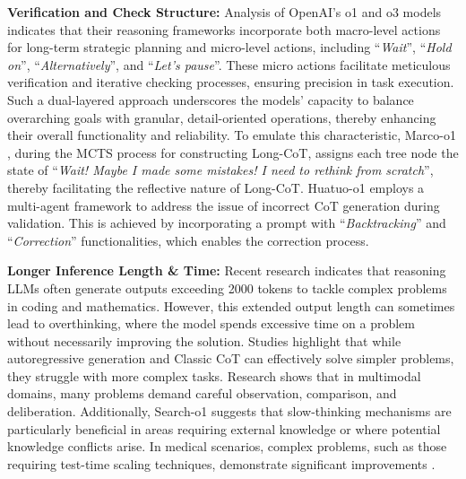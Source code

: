 \noindent\textbf{Verification and Check Structure:} Analysis of OpenAI's o1 \cite{openai_o1} and o3 \cite{o3-mini} models indicates that their reasoning frameworks incorporate both macro-level actions for long-term strategic planning and micro-level actions, including ``\textit{Wait}'', ``\textit{Hold on}'', ``\textit{Alternatively}'', and ``\textit{Let’s pause}''. 
These micro actions facilitate meticulous verification and iterative checking processes, ensuring precision in task execution. 
Such a dual-layered approach underscores the models' capacity to balance overarching goals with granular, detail-oriented operations, thereby enhancing their overall functionality and reliability. 
To emulate this characteristic, Marco-o1 \cite{Marco_o1}, during the MCTS process for constructing Long-CoT, assigns each tree node the state of ``\textit{Wait! Maybe I made some mistakes! I need to rethink from scratch}'', thereby facilitating the reflective nature of Long-CoT. 
Huatuo-o1 \cite{Huatuo-o1} employs a multi-agent framework to address the issue of incorrect CoT generation during validation. 
This is achieved by incorporating a prompt with ``\textit{Backtracking}'' and ``\textit{Correction}'' functionalities,  which enables the correction process.

\noindent\textbf{Longer Inference Length \& Time:} 
Recent research \cite{TowardsSystem2ReasoninLLM, o1_Journey_Part1, o1_Journey_Part2, huang2025o1, reflection_window} indicates that reasoning LLMs often generate outputs exceeding 2000 tokens to tackle complex problems in coding and mathematics. 
However, this extended output length can sometimes lead to overthinking, where the model spends excessive time on a problem without necessarily improving the solution. 
Studies \cite{TowardsSystem2ReasoninLLM} highlight that while autoregressive generation and Classic CoT can effectively solve simpler problems, they struggle with more complex tasks. 
Research \cite{VisualSlowAgent, SlowPerception} shows that in multimodal domains, many problems demand careful observation, comparison, and deliberation. 
Additionally, Search-o1 \cite{li2025search} suggests that slow-thinking mechanisms are particularly beneficial in areas requiring external knowledge or where potential knowledge conflicts arise. 
In medical scenarios, complex problems, such as those requiring test-time scaling techniques, demonstrate significant improvements \cite{huang2025o1}.



